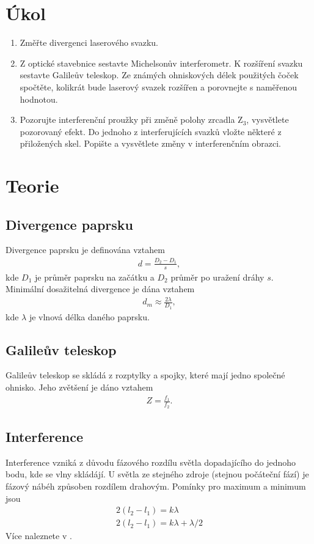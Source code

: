 \documentclass[a4paper,12pt]{article}
\begin{document}
\section{Úkol}
\begin{enumerate}
    \item Změřte divergenci laserového svazku.
    \item Z optické stavebnice sestavte Michelsonův interferometr. K rozšíření svazku sestavte Galileův teleskop. Ze známých ohniskových délek použitých čoček spočtěte, kolikrát bude laserový svazek rozšířen a porovnejte s naměřenou hodnotou.
    \item Pozorujte interferenční proužky při změně polohy zrcadla $\mbox{Z}_3$, vysvětlete pozorovaný efekt. Do jednoho z interferujících svazků vložte některé z přiložených skel. Popište a vysvětlete změny v interferenčním obrazci. 
\end{enumerate}

\section{Teorie}
\subsection{Divergence paprsku}
Divergence paprsku je definována vztahem
\begin{eqnarray}
d=\frac{D_2-D_1}{s},
\label{d}
\end{eqnarray}
kde $D_1$ je průměr paprsku na začátku a $D_2$ průměr po uražení dráhy $s$. Minimální dosažitelná divergence je dána vztahem
\begin{eqnarray}
d_m\approx \frac{2\lambda}{D_1},
\label{dm}
\end{eqnarray}
kde $\lambda$ je vlnová délka daného paprsku.

\subsection{Galileův teleskop}
Galileův teleskop se skládá z rozptylky a spojky, které mají jedno společné ohnisko. Jeho zvětšení je dáno vztahem
\begin{eqnarray}
Z=\frac{f_1}{f_2}.
\label{Z}
\end{eqnarray}

\subsection{Interference}
Interference vzniká z důvodu fázového rozdílu světla dopadajícího do jednoho bodu, kde se vlny skládájí. U světla ze stejného zdroje (stejnou počáteční fází) je fázový nábéh způsoben rozdílem drahovým. Pomínky pro maximum a minimum jsou
\begin{eqnarray}
2(l_2-l_1)=k\lambda \\
2(l_2-l_1)=k\lambda + \lambda/2
\end{eqnarray}
Více naleznete v \cite{maly}.
\end{document}
